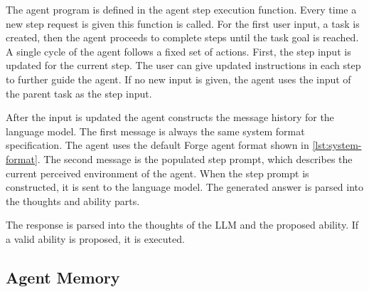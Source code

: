 \documentclass[../main.tex]{subfiles}
\begin{document}
The agent program is defined in the agent step execution function.
Every time a new step request is given this function is called.
For the first user input, a task is created,
then the agent proceeds to complete steps until the task goal is reached.
A single cycle of the agent follows a fixed set of actions.
First, the step input is updated for the current step.
The user can give updated instructions in each step to further guide the agent.
If no new input is given, the agent uses the input of the parent task as the step input.

After the input is updated the agent constructs the message history for the language model.
The first message is always the same system format specification.
The agent uses the default Forge agent format shown in \autoref{lst:system-format}.
The second message is the populated step prompt, which describes the current perceived environment of the agent.
When the step prompt is constructed, it is sent to the language model.
The generated answer is parsed into the thoughts and ability parts.

The response is parsed into the thoughts of the LLM and the proposed ability.
If a valid ability is proposed, it is executed.

\subsection{Agent Memory}
\end{document}
